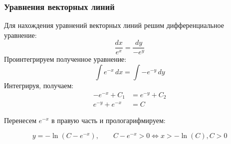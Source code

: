 \begin{frame}\frametitle{Уравнения векторных линий}
	Для нахождения уравнений векторных линий решим дифференциальное уравнение:
	\begin{equation*}
		\frac{dx}{e^x} = \frac{dy}{-e^y}
		\label{eq:vec_lines_definition}
	\end{equation*}
	Проинтегрируем полученное уравнение:
	\begin{equation*}
		\int e^{-x} \, dx = \int -e^{-y} \, dy
		\label{eq:vec_lines_int}
	\end{equation*}
	Интегрируя, получаем:
	\begin{align*}
		-e^{-x} + C_1    & = e^{-y} + C_2 \\
		e^{-y}  + e^{-x} & = C
		\label{eq:vec_lines_integrated}
	\end{align*}

	Перенесем \(e^{-x}\) в правую часть и прологарифмируем:

	\begin{equation}
		y = - \ln(C - e^{-x}), \qquad
		C - e^{-x} > 0 \Longleftrightarrow x > - \ln(C), C > 0
		\label{eq:vec_lines}
	\end{equation}

\end{frame}
